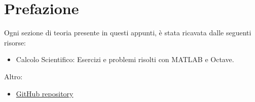\section*{Prefazione}

Ogni sezione di teoria presente in questi appunti, è stata ricavata dalle seguenti risorse:
\begin{itemize}
    \item Calcolo Scientifico: Esercizi e problemi risolti con MATLAB e Octave.\cite{quarteroni2017calcolo}
\end{itemize}
Altro:
\begin{itemize}
    \item[\faIcon{github}] \href{https://github.com/PoliMI-HPC-E-notes-projects-AndreVale69/HPC-E-PoliMI-university-notes}{GitHub repository}
\end{itemize}
